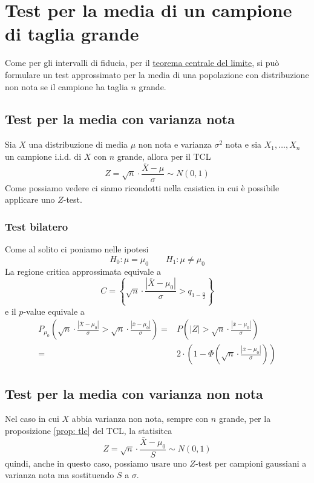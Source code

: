 \section{Test per la media di un campione di taglia grande}
Come per gli intervalli di fiducia, per il \hyperref[th: tlc]{teorema centrale del limite}, si può
formulare un test approssimato per la media di una popolazione con distribuzione non nota se il
campione ha taglia $n$ grande.

\subsection{Test per la media con varianza nota}
Sia $X$ una distribuzione di media $\mu$ non nota e varianza $\sigma^2$ nota e sia
$X_1, \dots, X_n$ un campione i.i.d. di $X$ con $n$ grande, allora per il TCL
\[ Z = \sqrt{n} \cdot \frac{\bar{X} - \mu}{\sigma} \sim N(0,1) \]
Come possiamo vedere ci siamo ricondotti nella casistica in cui è possibile applicare uno $Z$-test.

\subsubsection{Test bilatero}
Come al solito ci poniamo nelle ipotesi
\[ H_0 : \mu = \mu_0 \qquad H_1 : \mu \neq \mu_0 \]
La regione critica approssimata equivale a
\[ C = \left\{ \sqrt{n} \cdot \frac{|\bar{X} - \mu_0|}{\sigma} > q_{1 - \frac{\alpha}{2}} \right\} \]
e il $p$-value equivale a
\begin{align*}
	P_{\mu_0} \left( \sqrt{n} \cdot \frac{|\bar{X} - \mu_0|}{\sigma} >
	\sqrt{n} \cdot \frac{|\bar{x} - \mu_0|}{\sigma} \right) = &
	P \left( |Z| > \sqrt{n} \cdot \frac{|\bar{x} - \mu_0|}{\sigma} \right) \\
	=                                                         &
	2 \cdot \left( 1 - \Phi \left( \sqrt{n} \cdot \frac{|\bar{x} - \mu_0|}{\sigma} \right) \right)
\end{align*}

\subsection{Test per la media con varianza non nota}
Nel caso in cui $X$ abbia varianza non nota, sempre con $n$ grande, per la proposizione
\ref{prop: tlc} del TCL, la statisitca
\[ Z = \sqrt{n} \cdot \frac{\bar{X} - \mu_0}{S} \sim N(0,1) \]
quindi, anche in questo caso, possiamo usare uno $Z$-test per campioni gaussiani a varianza nota
ma sostituendo $S$ a $\sigma$.

